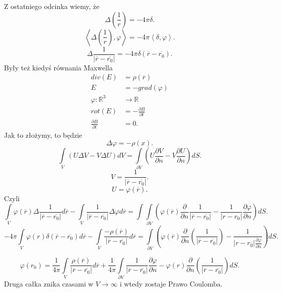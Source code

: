 \documentclass[../main.tex]{subfiles}
\begin{document}
Z ostatniego odcinka wiemy, że
\[
    \Delta\left( \frac{1}{r} \right) = - 4\pi \delta
.\]
\[
    \left< \Delta \left( \frac{1}{r} \right) , \varphi \right> = -4 \pi \left<\delta, \varphi \right>
.\]
\[
    \Delta \frac{1}{\left| \overline{r} - \overline{r_0} \right| } = -4 \pi \delta (\overline{r} - \overline{r_0})
.\]
Były też kiedyś równania Maxwella
\begin{align*}
    div(E) &= \rho(\overline{r})\\
    E &= - grad(\varphi)\\
    \varphi : \mathbb{R}^3 &\to \mathbb{R}\\
    rot(E) &= -\frac{\partial B}{\partial t}\\
    \frac{\partial B}{\partial t} &= 0
.\end{align*}
Jak to złożymy, to będzie
\[
    \Delta \varphi = -\rho(x)
.\]
\[
    \int\limits_{V} \left( U\Delta V - V \Delta U \right) dV = \int\limits_{\partial V}\left( U \frac{\partial V}{\partial n} - V \frac{\partial U}{\partial n}  \right)dS
.\]
\[
    V = \frac{1}{\left| \overline{r} - \overline{r_0} \right| }
.\]
\[
    U = \varphi(\overline{r})
.\]
Czyli
\[
    \int\limits_{V}\varphi(\overline{r}) \Delta \frac{1}{\left| \overline{r} - \overline{r_0} \right| }d\overline{r} - \int\limits_{V}\frac{1}{\left| \overline{r} - \overline{r_0} \right| }\Delta \varphi d\overline{r} = \int\int\limits_{\partial V}\left(\varphi(\overline{r})\frac{\partial }{\partial n} \frac{1}{\left| \overline{r} - \overline{r_0} \right|} - \frac{1}{\left| r - r_0 \right|}\frac{\partial \varphi}{\partial n} \right) dS
.\]
\[
    -4\pi \int\limits_V \varphi(r)\delta(\overline{r} - \overline{r_0})d\overline{r} - \int\limits_V \frac{-\rho(\overline{r})}{\left| \overline{r} - \overline{r_0} \right| }d\overline{r} = \int\limits_{\partial V}\left(\varphi\left( \overline{r} \right) \frac{\partial }{\partial n} \left( \frac{1}{\left| \overline{r} - \overline{r_0} \right| } \right) - \frac{1}{\left| r-r_0 \right| \frac{\partial \varphi}{\partial n} }\right) dS
.\]

\[
    \varphi(r_0) = \frac{1}{4\pi}\int\limits_V \frac{\rho(\overline{r})}{\left| \overline{r} - \overline{r_0} \right| }d\overline{r} + \frac{1}{4\pi} \int\limits_{\partial V}\frac{1}{\left| \overline{r} - \overline{r_0} \right|} \frac{\partial \varphi}{\partial n} - \varphi(r)\frac{\partial }{\partial n} \left( \frac{1}{\left| \overline{r} - \overline{r_0} \right| } \right)dS
.\]
Druga całka znika czasami w $V\to \infty$ i wtedy zostaje Prawo Coulomba.
\end{document}
